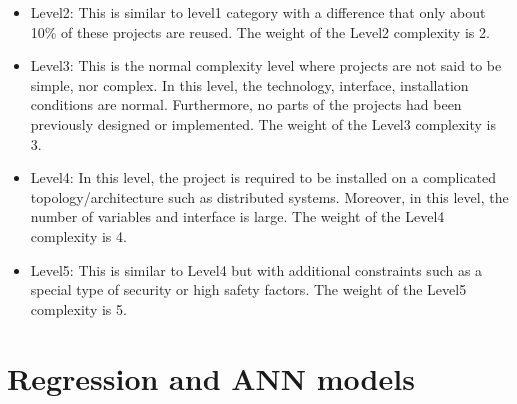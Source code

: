 \documentclass[8pt,twocolumn]{article}
\begin{document}
{\begin{itemize}
\item Level2: This is similar to level1 category with a difference that only about 10\% of these projects are reused. The weight of the Level2 complexity is 2.
\item Level3: This is the normal complexity level where projects are not said to be simple, nor complex. In this level, the technology, interface, installation conditions are normal. Furthermore, no parts of the projects had been previously
designed or implemented. The weight of the Level3 complexity is 3.
\item Level4: In this level, the project is required to be installed on a complicated topology/architecture such as distributed systems. Moreover, in this level, the number of variables and interface is large. The weight of the Level4 complexity is 4.
\item Level5: This is similar to Level4 but with additional constraints such as a special type of security or high safety factors. The weight of the Level5 complexity is 5.
\end{itemize}
\section{Regression and ANN models}
\label{sec5}
}
\end{document}
